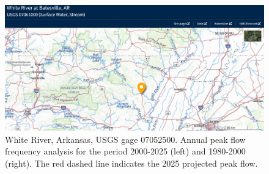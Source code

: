 \documentclass{tufte-handout}\usepackage[]{graphicx}\usepackage[]{xcolor}
\begin{document}
\begin{figure}
	\centering
		\includegraphics[width=1.00\textwidth]{figure/WhiteRiver.png}
		\caption{White River, Arkansas, USGS gage 07052500. Annual peak flow frequency analysis for the period 2000-2025 (left) and 1980-2000 (right). The red dashed line indicates the 2025 projected peak flow.}
	\label{fig:White River}
\end{figure}


\newpage
{}
 
\end{document}
